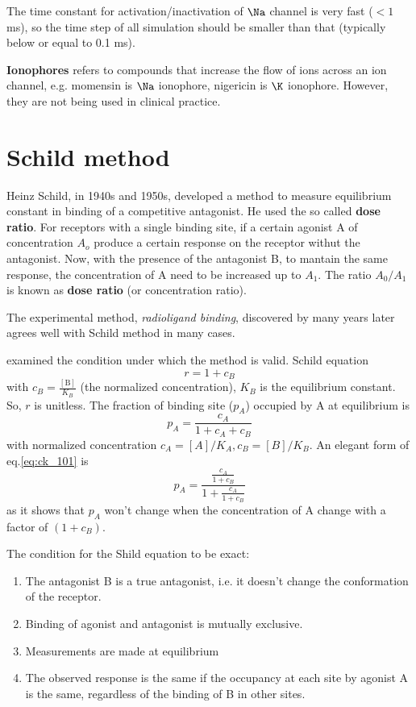 The time constant for activation/inactivation of $\Na$ channel is very fast ($<
1$ ms), so the time step of all simulation should be smaller than that
(typically below or equal to 0.1 ms).

{\bf Ionophores} refers to compounds that increase the flow of ions across an
ion channel, e.g. momensin is $\Na$ ionophore, nigericin is $\K$ ionophore.
However, they are not being used in clinical practice.

\section{Schild method}
\label{sec:schild_method}

Heinz Schild, in 1940s and 1950s, developed a method to measure equilibrium
constant in binding of a competitive antagonist. He used the so called {\bf dose
ratio}. For receptors with a single binding site, if a certain agonist A of
concentration $A_o$ produce a certain response on the receptor withut the
antagonist. Now, with the presence of the  antagonist B, to mantain the same
response, the concentration of A need to be  increased up to $A_1$. The ratio
$A_0/A_1$ is known as {\bf dose ratio} (or concentration ratio).

The experimental method, {\it radioligand binding}, discovered by
\citep{paton1965} many years later agrees well with Schild method in many cases.

\citep{colquhoun2007} examined the condition under which the method is valid.
Schild equation
\begin{equation}
r = 1 + c_B
\end{equation}
with $c_B = \frac{[\text{B}]}{K_B}$ (the normalized concentration), $K_B$ is the
equilibrium constant. So, $r$ is unitless. The fraction of binding site ($p_A$)
occupied by A at equilibrium is
\begin{equation}
\label{eq:ck_101}
p_A = \frac{c_A}{1+c_A+c_B}
\end{equation}
with normalized concentration $c_A=[A]/K_A, c_B=[B]/K_B$. An elegant form of
eq.\ref{eq:ck_101} is
\begin{equation}
p_A = \frac{\frac{c_A}{1+c_B}}{1+\frac{c_A}{1+c_B}}
\end{equation}
as it shows that $p_A$ won't change when the concentration of A change with a
factor of $(1+c_B)$.

The condition for the Shild equation to be exact:
\begin{enumerate}
  \item The antagonist B is a true antagonist, i.e. it doesn't change the
  conformation of the receptor.
  \item Binding of agonist and antagonist is mutually exclusive.
  \item Measurements are made at equilibrium
  \item The observed response is the same if the occupancy at each site by
  agonist A is the same, regardless of the binding of B in other sites.
\end{enumerate}


